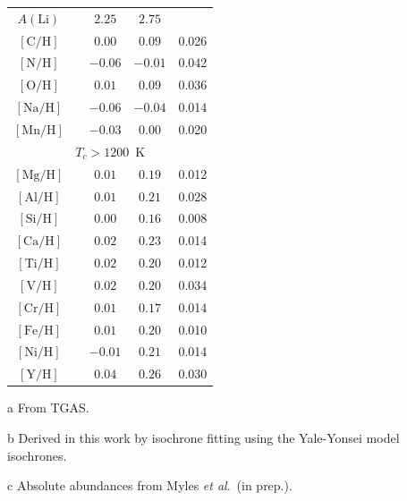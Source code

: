 \documentclass[12pt,letterpaper,margin=1in]{article}
\newcommand{\acronym}[1]{{\small{#1}}}
\newcommand{\tgas}{\acronym{TGAS}}
\newcommand{\etal}{\textit{et al}.}
\newcommand*\elem[1]{\ensuremath{\mathrm{#1}}}
\newcommand*\elemH[1]{\ensuremath{[\mathrm{#1}/\elem{H}]}}
\begin{document}
\begin{table}[htpb]
\begin{threeparttable}
\begin{tabular}{ccccc}
\hline
$A(\elem{Li})$\tnote{c} &                & $2.25$                 & $2.75$                 &               \\
$\elemH{C}$             &                & $0.00$                 & $0.09$                 & 0.026         \\
$\elemH{N}$             &                & $-0.06$                & $-0.01$                & 0.042         \\
$\elemH{O}$             &                & $0.01$                 & $0.09$                 & 0.036         \\
$\elemH{Na}$            &                & $-0.06$                & $-0.04$                & 0.014         \\
$\elemH{Mn}$            &                & $-0.03$                & $0.00$                 & 0.020         \\
\hline
\multicolumn{5}{c}{$T_c > 1200$~K} \\
\hline
$\elemH{Mg}$            &                & $0.01$                 & $0.19$                 & 0.012         \\
$\elemH{Al}$            &                & $0.01$                 & $0.21$                 & 0.028         \\
$\elemH{Si}$            &                & $0.00$                 & $0.16$                 & 0.008         \\
$\elemH{Ca}$            &                & $0.02$                 & $0.23$                 & 0.014         \\
$\elemH{Ti}$            &                & $0.02$                 & $0.20$                 & 0.012         \\
$\elemH{V}$             &                & $0.02$                 & $0.20$                 & 0.034         \\
$\elemH{Cr}$            &                & $0.01$                 & $0.17$                 & 0.014         \\
$\elemH{Fe}$            &                & $0.01$                 & $0.20$                 & 0.010         \\
$\elemH{Ni}$            &                & $-0.01$                & $0.21$                 & 0.014         \\
$\elemH{Y}$             &                & $0.04$                 & $0.26$                 & 0.030         \\
\hline
\end{tabular}
\begin{tablenotes}
\item [a] From \tgas.
\item [b] Derived in this work by isochrone fitting using the Yale-Yonsei model
  isochrones\cite{2013ApJ...776...87S}.
\item [c] Absolute abundances from Myles \etal\ (in prep.).
\end{tablenotes}
\end{threeparttable}
\end{table}
\end{document}
